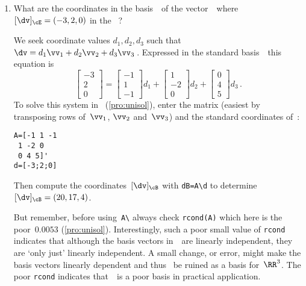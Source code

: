 \begin{example}
\begin{enumerate}
\item What are the coordinates in the basis~\cB\ of the vector~\dv\ where \([\dv]_\cE=(-3,2,0)\) in the ~\cE?
\begin{solution} 
We seek coordinate values \(d_1,d_2,d_3\) such that \(\dv=d_1\vv_1+d_2\vv_2+d_3\vv_3\)\,. 
Expressed in the standard basis~\cE\ this equation is
\begin{equation*}
\begin{bmatrix} -3\\2\\0 \end{bmatrix}=
\begin{bmatrix} -1\\1\\-1 \end{bmatrix}d_1+
\begin{bmatrix} 1\\-2\\0 \end{bmatrix}d_2+
\begin{bmatrix} 0\\4\\5 \end{bmatrix}d_3\,.
\end{equation*}
To solve this system in \script\ (\cref{pro:unisol}), enter the matrix (easiest by transposing rows of~\(\vv_1\), \(\vv_2\) and~\(\vv_3\)) and the standard coordinates of~\dv:
\begin{verbatim}
A=[-1 1 -1
 1 -2 0
 0 4 5]'
d=[-3;2;0]
\end{verbatim}
\setbox\ajrqrbox\hbox{}%
\marginajrbox%
Then compute the coordinates~\([\dv]_\cB\) with \verb|dB=A\d| to determine \([\dv]_\cB=(20,17,4)\).

But remember, before using~\verb|A\| always check \verb|rcond(A)| which here is the poor~\(0.0053\) (\cref{pro:unisol}).
Interestingly, such a poor small value of \verb|rcond| indicates that although the basis vectors in~\cB\ are linearly independent, they are `only just' linearly independent.
A small change, or error, might make the basis vectors linearly dependent and thus \cB~be ruined as a basis for~\(\RR^3\).
The poor \verb|rcond| indicates that~\cB\ is a poor basis in practical application.
\end{solution}
\end{enumerate}
\end{example}





